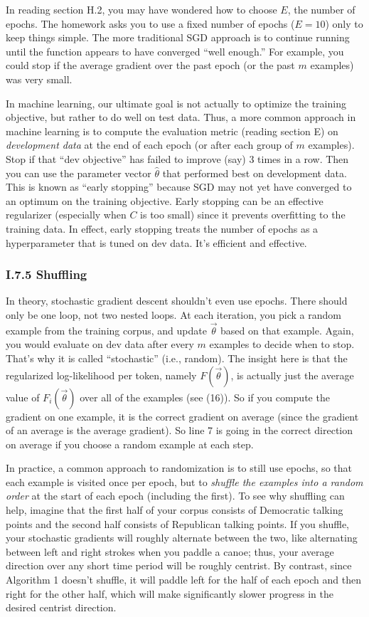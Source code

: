 \documentclass[12pt]{article}
\theoremstyle{plain}
\theoremstyle{definition}
\theoremstyle{remark}
\begin{document}
In reading section H.2, you may have wondered how to choose $E$, the number of epochs. The homework asks you to use a fixed number of epochs ($E=10$) only to keep things simple. The more traditional SGD approach is to continue running until the function appears to have converged “well enough.” For example, you could stop if the average gradient over the past epoch (or the past $m$ examples) was very small.

In machine learning, our ultimate goal is not actually to optimize the training objective, but rather to do well on test data. Thus, a more common approach in machine learning is to compute the evaluation metric (reading section E) on \emph{development data} at the end of each epoch (or after each group of $m$ examples). Stop if that “dev objective” has failed to improve (say) 3 times in a row. Then you can use the parameter vector $\hat{\theta}$ that performed best on development data. This is known as “early stopping” because SGD may not yet have converged to an optimum on the training objective. Early stopping can be an effective regularizer (especially when $C$ is too small) since it prevents overfitting to the training data. In effect, early stopping treats the number of epochs as a hyperparameter that is tuned on dev data. It’s efficient and effective.

\subsubsection*{I.7.5 Shuffling}

In theory, stochastic gradient descent shouldn’t even use epochs. There should only be one loop, not two nested loops. At each iteration, you pick a random example from the training corpus, and update $\vec{\theta}$ based on that example. Again, you would evaluate on dev data after every $m$ examples to decide when to stop. That’s why it is called “stochastic” (i.e., random). The insight here is that the regularized log-likelihood per token, namely $F(\vec{\theta})$, is actually just the average value of $F_i(\vec{\theta})$ over all of the examples (see (16)). So if you compute the gradient on one example, it is the correct gradient on average (since the gradient of an average is the average gradient). So line 7 is going in the correct direction on average if you choose a random example at each step.

In practice, a common approach to randomization is to still use epochs, so that each example is visited once per epoch, but to \emph{shuffle the examples into a random order} at the start of each epoch (including the first). To see why shuffling can help, imagine that the first half of your corpus consists of Democratic talking points and the second half consists of Republican talking points. If you shuffle, your stochastic gradients will roughly alternate between the two, like alternating between left and right strokes when you paddle a canoe; thus, your average direction over any short time period will be roughly centrist. By contrast, since Algorithm 1 doesn’t shuffle, it will paddle left for the half of each epoch and then right for the other half, which will make significantly slower progress in the desired centrist direction.
\end{document}
